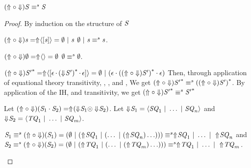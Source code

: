 \documentclass[acmsmall]{acmart}
\begin{document}
\begin{lemma}
  \label{lem:there-and-back-equiv}
  $(\Uparrow \circ \Downarrow) \mathit{S} \equiv^s \mathit{S}$
\end{lemma}
\begin{proof}
  By induction on the structure of $\mathit{S}$
  \begin{case}[\BaseRegexType{}]
    $(\Uparrow \circ \Downarrow)\mathit{s} =
    \Uparrow\mkern-4mu \langle[\mathit{s}]\rangle = \emptyset ~|~ \mathit{s}$
    $\emptyset ~|~ \mathit{s} \equiv^s \mathit{s}$.
  \end{case}

  \begin{case}[\EmptyRegexType{}]
    $(\Uparrow \circ \Downarrow)\emptyset =
    \Uparrow\mkern-4mu \langle\rangle = \emptyset$
    $\emptyset \equiv^s \emptyset$.
  \end{case}

  \begin{case}[\StarRegexType{}]
    $(\Uparrow \circ \Downarrow){\mathit{S}'}^* =
    \Uparrow\mkern-4mu \langle[\epsilon \mkern-1mu\cdot\mkern-1mu {(\Downarrow\mkern-4mu \mathit{S}')}^* \mkern-1mu\cdot\mkern-1mu \epsilon]\rangle
    = \emptyset ~|~ (\epsilon \cdot {((\ensuremath{\Uparrow}\ensuremath{\circ}\ensuremath{\Downarrow})\ensuremath{\mathit{S}}')}^*
    \cdot \epsilon)$
    Then, through application of equational theory transitivity,
    \OrIdentityRule{}, \ConcatIdentityLeftRule{}, and \ConcatIdentityRightRule{},
    We get $(\Uparrow \circ \Downarrow){\mathit{S}'}^* \equiv^s
    {((\Uparrow \circ \Downarrow)\mathit{S}')}^*$.
    By application of the IH, and transitivity, we get
    $(\Uparrow \circ \Downarrow){\mathit{S}'}^* \equiv^s
    {\mathit{S}'}^*$
  \end{case}

  \begin{case}[\ConcatRegexType{}]
    Let $(\Uparrow \circ \Downarrow)(\mathit{S}_1 \cdot \mathit{S}_2) =
    \Uparrow\mkern-4mu (\Downarrow\mkern-4mu \mathit{S}_1 \odot \Downarrow\mkern-4mu \mathit{S}_2)$.
    Let $\Downarrow\mkern-4mu \mathit{S}_1 = \langle\mathit{SQ}_1 ~|~ \ldots ~|~ \mathit{SQ}_n\rangle$ and
    $\Downarrow\mkern-4mu \mathit{S}_2 = \langle\mathit{TQ}_1 ~|~ \ldots ~|~ \mathit{SQ}_m\rangle$.

    $\mathit{S}_1 \equiv^s (\Uparrow \circ \Downarrow)(\mathit{S}_1) =
    (\emptyset ~|~ (\Uparrow\mkern-4mu \mathit{SQ}_1 ~|~ (\ldots ~|~
    (\Uparrow\mkern-4mu \mathit{SQ}_n)\ldots))) \equiv^s
    \Uparrow\mkern-4mu \mathit{SQ}_1 ~|~ \ldots ~|~ \Uparrow\mkern-4mu \mathit{SQ}_n$
    and
    $\mathit{S}_2 \equiv^s (\Uparrow \circ \Downarrow)(\mathit{S}_2) =
    (\emptyset ~|~ (\Uparrow\mkern-4mu \mathit{TQ}_1 ~|~ (\ldots ~|~
    (\Uparrow\mkern-4mu \mathit{TQ}_m)\ldots))) \equiv^s
    \Uparrow\mkern-4mu \mathit{TQ}_1 ~|~ \ldots ~|~ \Uparrow\mkern-4mu \mathit{TQ}_m$.


\end{case}
\end{proof}
\end{document}
